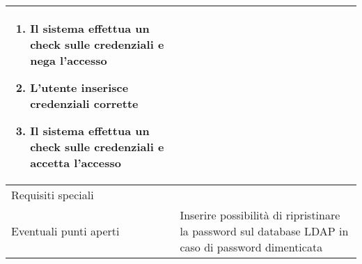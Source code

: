 \documentclass[../../main.tex]{subfiles}
\begin{document}
\begin{tabularx}{150mm}{|l|X|}
\begin {enumerate}
\item{Il sistema effettua un check sulle credenziali e nega l'accesso}
\item{L'utente inserisce credenziali corrette}
\item{Il sistema effettua un check sulle credenziali e accetta l'accesso}
    \end{enumerate}
    \\
    \hline
    Requisiti speciali                  &    \\
    \hline
    Eventuali punti aperti              &    Inserire possibilità di ripristinare la password sul database LDAP in caso di password dimenticata \\
    \hline
\end{tabularx}
\newpage
\end{document}

